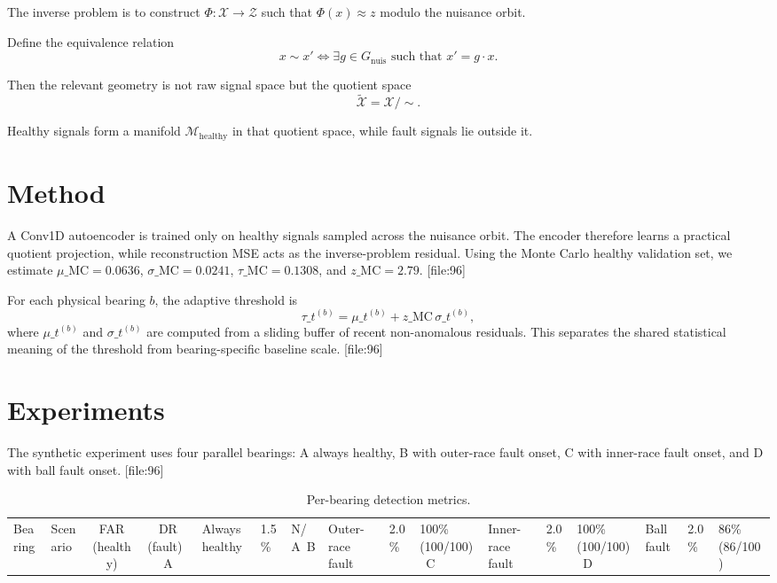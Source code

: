 \documentclass[11pt, letterpaper]{article}
\newcommand{\Mhealthy}{\mathcal{M}_{\mathrm{healthy}}}
\newcommand{\Gnuis}{G_{\mathrm{nuis}}}
\newcommand{\Lspace}{\mathcal{Z}}
\newcommand{\Xspace}{\mathcal{X}}
\begin{document}
The inverse problem is to construct \(\Phi: \Xspace \to \Lspace\) such that \(\Phi(x) \approx z\) modulo the nuisance orbit.

Define the equivalence relation
\[x \sim x' \iff \exists g \in \Gnuis \text{ such that } x' = g \cdot x.\]

Then the relevant geometry is not raw signal space but the quotient space
\[\widetilde{\Xspace} = \Xspace/\sim.\]

Healthy signals form a manifold \(\Mhealthy\) in that quotient space, while fault signals lie outside it.

\section{Method}

A Conv1D autoencoder is trained only on healthy signals sampled across the nuisance orbit. The encoder therefore learns a practical quotient projection, while reconstruction MSE acts as the inverse-problem residual. Using the Monte Carlo healthy validation set, we estimate \(\mu\_{\mathrm{MC}}=0.0636\), \(\sigma\_{\mathrm{MC}}=0.0241\), \(\tau\_{\mathrm{MC}}=0.1308\), and \(z\_{\mathrm{MC}}=2.79\). [file:96]

For each physical bearing \(b\), the adaptive threshold is
\[\tau\_t^{(b)} = \mu\_t^{(b)} + z\_{\mathrm{MC}}\,\sigma\_t^{(b)},\]
where \(\mu\_t^{(b)}\) and \(\sigma\_t^{(b)}\) are computed from a sliding buffer of recent non-anomalous residuals. This separates the shared statistical meaning of the threshold from bearing-specific baseline scale. [file:96]

\section{Experiments}

The synthetic experiment uses four parallel bearings: A always healthy, B with outer-race fault onset, C with inner-race fault onset, and D with ball fault onset. [file:96]

\begin{table}[H]
\centering
\caption{Per-bearing detection metrics.}
\label{tab:results}
\begin{tabular}{llcc}
\toprule
Bearing & Scenario & FAR (healthy) & DR (fault)\
\midrule
A & Always healthy & 1.5\% & N/A\
B & Outer-race fault & 2.0\% & 100\% (100/100)\
C & Inner-race fault & 2.0\% & 100\% (100/100)\
D & Ball fault & 2.0\% & 86\% (86/100)\
\bottomrule
\end{tabular}
\end{table}
\end{document}

